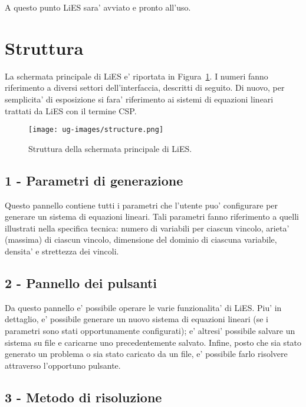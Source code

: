 \documentclass{article}
\begin{document}
A questo punto LiES sara' avviato e pronto all'uso.


\section{Struttura}
\label{sec:struttura}

La schermata principale di LiES e' riportata in Figura~\ref{fig:struttura}. I numeri fanno riferimento a diversi settori dell'interfaccia, descritti di seguito. Di nuovo, per semplicita' di esposizione si fara' riferimento ai sistemi di equazioni lineari trattati da LiES con il termine CSP.

\begin{figure}[htp!]
	\centering
	\texttt{[image: ug-images/structure.png]}
	\caption{Struttura della schermata principale di LiES.}
	\label{fig:struttura}
\end{figure}

\subsection{1 - Parametri di generazione} 

Questo pannello contiene tutti i parametri che l'utente puo' configurare per generare un sistema di equazioni lineari. Tali parametri fanno riferimento a quelli illustrati nella specifica tecnica: numero di variabili per ciascun vincolo, arieta' (massima) di ciascun vincolo, dimensione del dominio di ciascuna variabile, densita' e strettezza dei vincoli.

\subsection{2 - Pannello dei pulsanti}

Da questo pannello e' possibile operare le varie funzionalita' di LiES. Piu' in dettaglio, e' possibile generare un nuovo sistema di equazioni lineari (se i parametri sono stati opportunamente configurati); e' altresi' possibile salvare un sistema su file e caricarne uno precedentemente salvato. Infine, posto che sia stato generato un problema o sia stato caricato da un file, e' possibile farlo risolvere attraverso l'opportuno pulsante.

\subsection{3 - Metodo di risoluzione}
\end{document}
